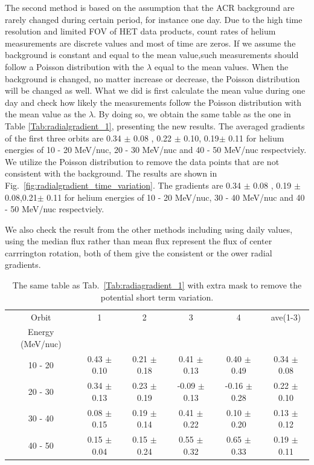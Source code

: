 The second method is based on the assumption that the \ac{ACR} background are rarely changed during certain period, for instance one day. Due to the high time resolution and limited \ac{FOV} of \ac{HET} data products, count rates of helium measurements are discrete values and most of time are zeros. If we assume the background is constant and equal to the mean value,such measurements should follow a Poisson distribution with the $\lambda$ equal to the mean values. When the background is changed, no matter increase or decrease, the Poisson distribution will be changed as well. 
What we did is first calculate the mean value during one day and check how likely the measurements follow the Poisson distribution with the mean value as the $\lambda$.
By doing so, we obtain the same table as the one in Table \ref{Tab:radialgradient_1}, presenting the new results.
The averaged gradients of the first three orbits are 0.34 $\pm$ 0.08 , 0.22 $\pm$ 0.10, 0.19$\pm$ 0.11 for helium energies of 10 - 20 MeV/nuc, 20 - 30 MeV/nuc and 40 - 50 MeV/nuc respectviely. We utilize the Poisson distribution to remove the data points that are not consistent with the background. The results are shown in Fig.~\ref{fig:radialgradient_time_variation}. The gradients are 0.34 $\pm$ 0.08 , 0.19 $\pm$ 0.08,0.21$\pm$ 0.11 for helium energies of 10 - 20 MeV/nuc, 30 - 40 MeV/nuc and 40 - 50 MeV/nuc respectviely.

We also check the result from the other methods including using daily values, using the median flux rather than mean flux represent the flux of center carrrington rotation, both of them give the consistent or the ower radial gradients.

\begin{table}[!htb]
    \centering

    \begin{tabular}{|c|c|c|c|c|c|}
    \hline
    Orbit   & 1                 & 2              & 3               & 4  & ave(1-3)\\
    Energy (MeV/nuc)  &         &                &                 &    &        \\  
    \hline
    10 - 20 &  0.43 $\pm$ 0.10 & 0.21 $\pm$ 0.18 & 0.41 $\pm$ 0.13 & 0.40 $\pm$ 0.49  & 0.34 $\pm$ 0.08\\
    \hline
    20 - 30 &  0.34 $\pm$ 0.13 & 0.23 $\pm$ 0.19 & -0.09 $\pm$ 0.13 & -0.16 $\pm$ 0.28  & 0.22 $\pm$ 0.10\\
    \hline
    30 - 40 &  0.08 $\pm$ 0.15 & 0.19 $\pm$ 0.14 & 0.41 $\pm$ 0.22 & 0.10 $\pm$ 0.20 & 0.13 $\pm$ 0.12\\
    \hline
    40 - 50 &  0.15 $\pm$ 0.04 & 0.15 $\pm$ 0.24 & 0.55 $\pm$ 0.32 & 0.65 $\pm$ 0.33 & 0.19 $\pm$ 0.11\\
    \hline
    \end{tabular}
    \caption[Table of helium radial gradient with extra mask]{The same table as Tab.~\ref{Tab:radiagradient_1} with extra mask to remove the potential short term variation. }
    \label{Tab:radialgradient_2}
\end{table}

